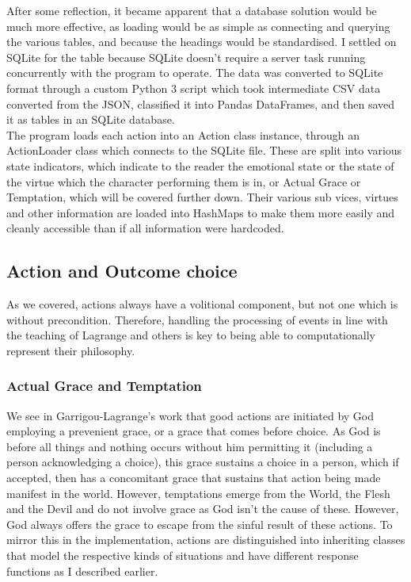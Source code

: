 \documentclass[12pt]{article}
\begin{document}
After some reflection, it became apparent that a database solution would be much more effective, as loading would be as simple as connecting and querying the various tables, and because the headings would be standardised. I settled on SQLite for the table because SQLite doesn't require a server task running concurrently with the program to operate. The data was converted to SQLite format through a custom Python 3 script which took intermediate CSV data converted from the JSON, classified it into Pandas DataFrames, and then saved it as tables in an SQLite database.\\

The program loads each action into an Action class instance, through an ActionLoader class which connects to the SQLite file. These are split into various state indicators, which indicate to the reader the emotional state or the state of the virtue which the character performing them is in, or Actual Grace or Temptation, which will be covered further down. Their various sub vices, virtues and other information are loaded into HashMaps to make them more easily and cleanly accessible than if all information were hardcoded. 

\subsection{Action and Outcome choice}
As we covered, actions always have a volitional component, but not one which is without precondition. Therefore, handling the processing of events in line with the teaching of Lagrange and others is key to being able to computationally represent their philosophy. \\
\subsubsection{Actual Grace and Temptation}
We see in Garrigou-Lagrange's work \cite{garrigou2013three} that good actions are initiated by God employing a prevenient grace, or a grace that comes before choice. As God is before all things and nothing occurs without him permitting it (including a person acknowledging a choice), this grace sustains a choice in a person, which if accepted, then has a concomitant grace that sustains that action being made manifest in the world. However, temptations emerge from the World, the Flesh and the Devil and do not involve grace as God isn't the cause of these. However, God always offers the grace to escape from the sinful result of these actions. To mirror this in the implementation, actions are distinguished into inheriting classes that model the respective kinds of situations and have different response functions as I described earlier. \\
\end{document}
